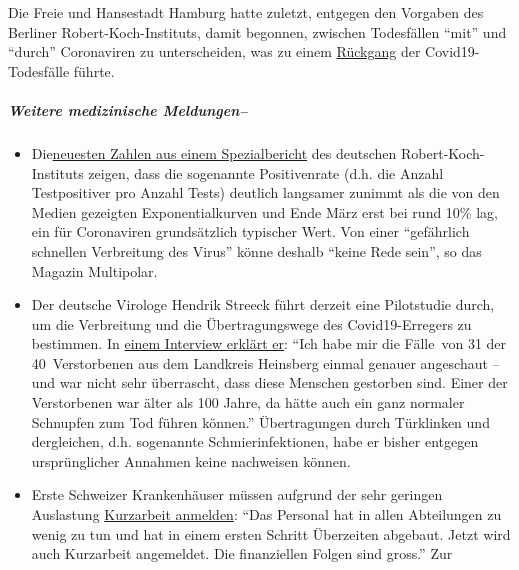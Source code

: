 Die Freie und Hansestadt Hamburg hatte zuletzt, entgegen den Vorgaben
des Berliner Robert-Koch-Instituts, damit begonnen, zwischen Todesfällen
``mit'' und ``durch'' Coronaviren zu unterscheiden, was zu einem
\href{https://www.t-online.de/nachrichten/deutschland/id_87636856/coronavirus-hamburg-will-nur-echte-covid-19-tote-zaehlen.html}{Rückgang}
der Covid19-Todesfälle führte.

\hypertarget{weitere-medizinische-meldungen-1}{%
\subparagraph{\texorpdfstring{\textbf{Weitere medizinische
Meldungen}--}{Weitere medizinische Meldungen--}}\label{weitere-medizinische-meldungen-1}}

\begin{itemize}
\tightlist
\item
  Die\href{https://multipolar-magazin.de/artikel/coronavirus-regierung-ignoriert-daten}{neuesten
  Zahlen aus einem Spezialbericht} des deutschen Robert-Koch-Instituts
  zeigen, dass die sogenannte Positivenrate (d.h. die Anzahl
  Testpositiver pro Anzahl Tests) deutlich langsamer zunimmt als die von
  den Medien gezeigten Exponentialkurven und Ende März erst bei rund
  10\% lag, ein für Coronaviren grundsätzlich typischer Wert. Von einer
  ``gefährlich schnellen Verbreitung des Virus'' könne deshalb ``keine
  Rede sein'', so das Magazin Multipolar.
\item
  Der deutsche Virologe Hendrik Streeck führt derzeit eine Pilotstudie
  durch, um die Verbreitung und die Übertragungswege des
  Covid19-Erregers zu bestimmen. In
  \href{https://www.zeit.de/wissen/gesundheit/2020-04/hendrik-streeck-covid-19-heinsberg-symptome-infektionsschutz-massnahmen-studie/komplettansicht}{einem
  Interview erklärt er}: ``Ich habe mir die Fälle~von 31 der
  40~Verstorbenen aus dem Landkreis Heinsberg einmal genauer angeschaut
  -- und war nicht sehr überrascht, dass diese Menschen gestorben sind.
  Einer der Verstorbenen war älter als 100 Jahre, da hätte auch ein ganz
  normaler Schnupfen zum Tod führen können.'' Übertragungen durch
  Türklinken und dergleichen, d.h. sogenannte Schmier­infektionen, habe
  er bisher entgegen ursprünglicher Annahmen keine nachweisen können.
\item
  Erste Schweizer Krankenhäuser müssen aufgrund der sehr geringen
  Auslastung
  \href{https://www.engadinerpost.ch/2020/4/04/Engadiner-Spitaeler-haben-freie-Kapazitaeten}{Kurzarbeit
  anmelden}: ``Das Personal hat in allen Abteilungen zu wenig zu tun und
  hat in einem ersten Schritt Überzeiten abgebaut. Jetzt wird auch
  Kurzarbeit angemeldet. Die finanziellen Folgen sind gross.'' Zur

\end{itemize}
